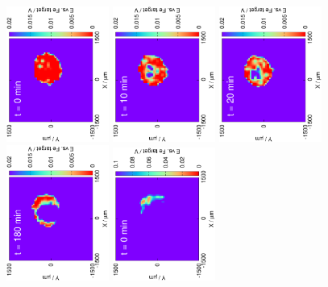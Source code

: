 \documentclass[3p]{elsarticle}
\begin{document}
\begin{figure}[H]
\centering
\includegraphics[trim = 20mm 30mm 0mm 20mm, clip, width=0.3\textwidth, angle=-90]{17052401.eps} 
\includegraphics[trim = 20mm 30mm 0mm 20mm, clip, width=0.3\textwidth, angle=-90]{17052402.eps}
\includegraphics[trim = 20mm 30mm 0mm 20mm, clip, width=0.3\textwidth, angle=-90]{17052403.eps} 
\includegraphics[trim = 20mm 30mm 0mm 20mm, clip, width=0.3\textwidth, angle=-90]{17052405.eps}
\includegraphics[trim = 20mm 30mm 0mm 20mm, clip, width=0.3\textwidth, angle=-90]{18011710.eps} 


\end{figure}
\end{document}
